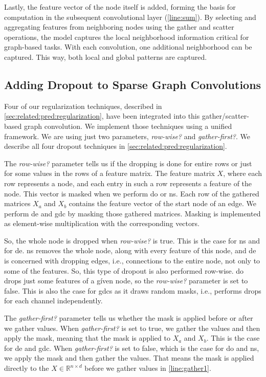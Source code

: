 Lastly, the feature vector of the node itself is added, forming the basis for computation in the subsequent convolutional layer (\cref{line:sum}).
By selecting and aggregating features from neighboring nodes using the gather and scatter operations, the model captures the local neighborhood information critical for graph-based tasks.
With each convolution, one additional neighborhood can be captured.
This way, both local and global patterns are captured.

\subsection{Adding Dropout to Sparse Graph Convolutions}
\label{sec:implement:gnndropout:dropout}
Four of our regularization techniques, described in \cref{sec:related:pred:regularization}, have been integrated into this gather/scatter-based graph convolution.
We implement those techniques using a unified framework.
We are using just two parameters, \textit{row-wise?} and \textit{gather-first?}.
We describe all four dropout techniques in \cref{sec:related:pred:regularization}.

The \textit{row-wise?} parameter tells us if the dropping is done for entire rows or just for some values in the rows of a feature matrix.
The feature matrix $X$, where each row represents a node, and each entry in such a row represents a feature of the node.
This vector is masked when we perform \ac{do} or \ac{ns}.
Each row of the gathered matrices $X_a$ and $X_b$ contains the feature vector of the start node of an edge.
We perform \ac{de} and \ac{gdc} by masking those gathered matrices.
Masking is implemented as element-wise multiplication with the corresponding vectors.

So, the whole node is dropped when \textit{row-wise?} is true.
This is the case for \acf{ns} and for \acf{de}. \Ac{ns} removes the whole node, along with every feature of this node, and \ac{de} is concerned with dropping edges, i.e., connections to the entire node, not only to some of the features.
So, this type of dropout is also performed row-wise.
\Acf{do} drops just some features of a gíven node, so the \textit{row-wise?} parameter is set to false.
This is also the case for \acp{gdc} as it draws random masks, i.e., performs drops for each channel independently.

The \textit{gather-first?} parameter tells us whether the mask is applied before or after we gather values.
When \textit{gather-first?} is set to true, we gather the values and then apply the mask, meaning that the mask is applied to $X_{a}$ and $X_b$.
This is the case for \ac{de} and \ac{gdc}.
When \textit{gather-first?} is set to false, which is the case for \ac{do} and \ac{ns}, we apply the mask and then gather the values.
That means the mask is applied directly to the $X \in \mathbb{R}^{n \times d}$ before we gather values in \cref{line:gather1}.

